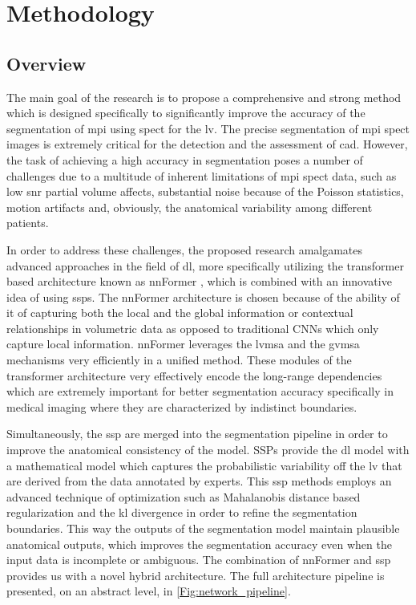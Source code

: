 \chapter{Methodology}
\label{ch:method}

\section{Overview}
The main goal of the research is to propose a comprehensive and strong method which is designed specifically to significantly improve the accuracy of the segmentation of \gls{mpi} using \gls{spect} for the \gls{lv}. The precise segmentation of \gls{mpi} \gls{spect} images is extremely critical for the detection and the assessment of \gls{cad}. However, the task of achieving a high accuracy in segmentation poses a number of challenges due to a multitude of inherent limitations of \gls{mpi} \gls{spect} data, such as low \gls{snr} partial volume affects, substantial noise because of the Poisson statistics, motion artifacts and, obviously, the anatomical variability among different patients. 

In order to address these challenges, the proposed research amalgamates advanced approaches in the field of \gls{dl}, more specifically utilizing the transformer based architecture known as nnFormer \cite{10.1109/TIP.2023.3293771}, which is combined with an innovative idea of using \gls{ssp}s. The nnFormer architecture is chosen because of the ability of it of capturing both the local and the global information or contextual relationships in volumetric data as opposed to traditional CNNs which only capture local information. nnFormer leverages the \gls{lvmsa} and the \gls{gvmsa} mechanisms very efficiently in a unified method. These modules of the transformer architecture very effectively encode the long-range dependencies which are extremely important for better segmentation accuracy specifically in medical imaging where they are characterized by indistinct boundaries.

Simultaneously, the \gls{ssp} are merged into the segmentation pipeline in order to improve the anatomical consistency of the model. SSPs provide the \gls{dl} model with a mathematical model which captures the probabilistic variability off the \gls{lv} that are derived from the data annotated by experts. This \gls{ssp} methods employs an advanced technique of optimization such as Mahalanobis distance based regularization and the \gls{kl} divergence in order to refine the segmentation boundaries. This way the outputs of the segmentation model maintain plausible anatomical outputs, which improves the segmentation accuracy even when the input data is incomplete or ambiguous. The combination of nnFormer and \gls{ssp} provides us with a novel hybrid architecture. The full architecture pipeline is presented, on an abstract level, in \cref{Fig:network_pipeline}.

